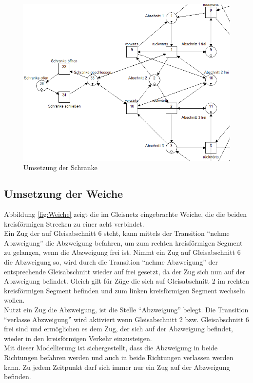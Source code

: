 \documentclass[10pt]{scrartcl}
\begin{document}
\begin{figure}[htbp]
	\centering	\includegraphics[width=1.0\textwidth]{Bilder/Aufgabe2_Schranke.png}
	\caption{Umsetzung der Schranke}
	\label{fig:Schranke}
\end{figure}

\subsection{Umsetzung der Weiche}
Abbildung \ref{fig:Weiche} zeigt die im Gleisnetz eingebrachte Weiche, die die beiden kreisförmigen Strecken zu einer acht verbindet.\\
Ein Zug der auf Gleisabschnitt 6 steht, kann mittels der Transition "`nehme Abzweigung"' die Abzweigung befahren, um zum rechten kreisförmigen Segment zu gelangen, wenn die Abzweigung frei ist. Nimmt ein Zug auf Gleisabschnitt 6 die Abzweigung so, wird durch die Transition "`nehme Abzweigung"' der entsprechende Gleisabschnitt wieder auf frei gesetzt, da der Zug sich nun auf der Abzweigung befindet. Gleich gilt für Züge die sich auf Gleisabschnitt 2 im rechten kreisförmigen Segment befinden  und zum linken kreisförmigen Segment wechseln wollen.\\
Nutzt ein Zug die Abzweigung, ist die Stelle  "`Abzweigung"' belegt. Die Transition "`verlasse Abzweigung"' wird aktiviert wenn Gleisabschnitt 2 bzw. Gleisabschnitt 6 frei sind und ermöglichen es dem Zug, der sich auf der Abzweigung befindet, wieder in den kreisförmigen Verkehr einzusteigen.\\
Mit dieser Modellierung ist sichergestellt, dass die Abzweigung in beide Richtungen befahren werden und auch in beide Richtungen verlassen werden kann. Zu jedem Zeitpunkt darf sich immer nur ein Zug auf der Abzweigung befinden.
\end{document}
